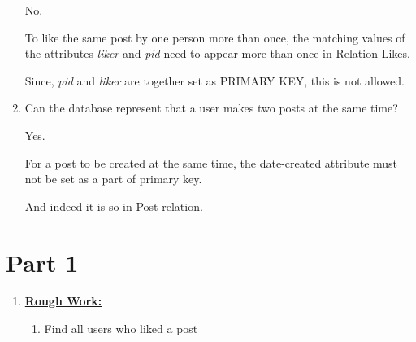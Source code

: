\documentclass[12pt]{article}
\begin{document}
\begin{enumerate}[1.]
\begin{mdframed}
        No.

        \bigskip

        To like the same post by one person more than once, the matching values of
        the attributes \textit{liker} and \textit{pid} need to appear more than once in
        Relation Likes.

        \bigskip

        Since, \textit{pid} and \textit{liker} are together set as PRIMARY KEY, this
        is not allowed.

    \end{mdframed}

    \item Can the database represent that a user makes two posts at the same time?

    \bigskip

    \begin{mdframed}

    Yes.

    \bigskip

    For a post to be created at the same time, the date-created attribute must
    not be set as a part of primary key.

    \bigskip

    And indeed it is so in Post relation.

    \end{mdframed}
\end{enumerate}

\section*{Part 1}

\begin{enumerate}[1.]
    \item

    \bigskip

    \underline{\textbf{Rough Work:}}

    \bigskip

    \begin{enumerate}[1.]
        \item Find all users who liked a post

        \begin{mdframed}

        \end{mdframed}
    \end{enumerate}

\end{enumerate}
\end{document}
